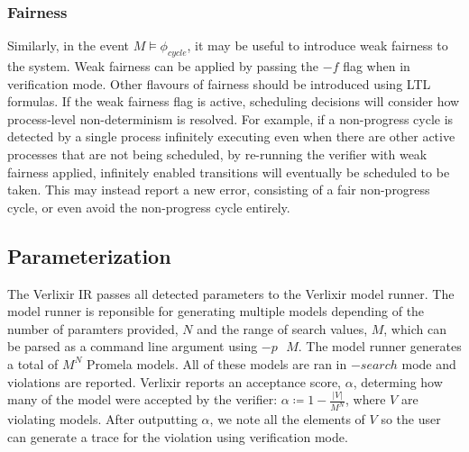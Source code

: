 \subsubsection{Fairness}
Similarly, in the event $M \models \phi _{cycle}$, it may be useful to introduce weak fairness to the system. Weak fairness can be applied by passing the $-f$ flag when in verification mode. Other flavours of fairness should be introduced using LTL formulas. If the weak fairness flag is active, scheduling decisions will consider how process-level non-determinism is resolved. For example, if a non-progress cycle is detected by a single process infinitely executing even when there are other active processes that are not being scheduled, by re-running the verifier with weak fairness applied, infinitely enabled transitions will eventually be scheduled to be taken. This may instead report a new error, consisting of a fair non-progress cycle, or even avoid the non-progress cycle entirely.  
\subsection{Parameterization}
The Verlixir IR passes all detected parameters to the Verlixir model runner. The model runner is reponsible for generating multiple models depending of the number of paramters provided, $N$ and the range of search values, $M$, which can be parsed as a command line argument using $-p\text{ }M$. The model runner generates a total of $M^N$ Promela models. All of these models are ran in $-search$ mode and violations are reported. Verlixir reports an acceptance score, $\alpha$, determing how many of the model were accepted by the verifier: $\alpha \coloneq 1 - \frac{|V|}{M^N}$, where $V$ are violating models. After outputting $\alpha$, we note all the elements of $V$ so the user can generate a trace for the violation using verification mode.

